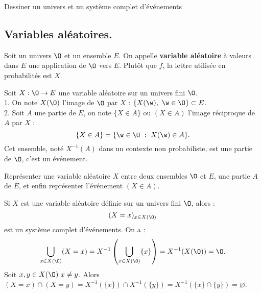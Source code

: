 \documentclass[11pt]{article}
\begin{document}
\begin{ex}{}{}
    Dessiner un univers et un système complet d'événements
\end{ex}

\subsection{Variables aléatoires.}

\begin{nota}{}{}
    Soit un univers $\O$ et un ensemble $E$. On appelle \textbf{variable aléatoire} à valeurs dans $E$ une application de $\O$ vers $E$. Plutôt que $f$, la lettre utilisée en probabilités est $X$.
\end{nota}

\begin{defi}{}{}
    Soit $X:\O\to E$ une variable aléatoire sur un univers fini $\O$.\\
    1. On note $X(\O)$ l'image de $\O$ par $X$ : $\{X(\w), ~ \w\in\O\}\subset E$.\\
    2. Soit $A$ une partie de $E$, on note $\{X\in A\}$ ou $(X\in A)$ l'image réciproque de $A$ par $X$ :
    \begin{equation*}
        \{X\in A\} = \{\w\in\O~:~X(\w)\in A\}.
    \end{equation*}
    Cet ensemble, noté $X^{-1}(A)$ dans un contexte non probabiliste, est une partie de $\O$, c'est un événement.
\end{defi}

\begin{ex}{}{}
    Représenter une variable aléatoire $X$ entre deux ensembles $\O$ et $E$, une partie $A$ de $E$, et enfin représenter l'événement $(X\in A)$.
\end{ex}

\begin{prop}{}{}
    Si $X$ est une variable aléatoire définie sur un univers fini $\O$, alors :
    \begin{equation*}
        (X=x)_{x\in X(\O)}
    \end{equation*}
    est un système complet d'événements.
    \tcblower
    On a :
    \begin{equation*}
        \bigcup_{x\in X(\O)}(X=x)=X^{-1}\left(\bigcup_{x\in X(\O)}\{x\}\right)=X^{-1}(X(\O))=\O.
    \end{equation*}
    Soit $x,y\in X(\O) ~ x\neq y$. Alors $(X=x)\cap(X=y)=X^{-1}(\{x\})\cap X^{-1}(\{y\})=X^{-1}(\{x\}\cap\{y\})=\varnothing$.
\end{prop}
\end{document}
